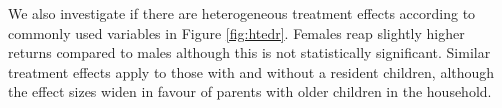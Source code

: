 \documentclass[12pt, a4paper]{article}
\begin{document}
We also investigate if there are heterogeneous treatment effects according to commonly used variables in Figure \ref{fig:htedr}. Females reap slightly higher returns compared to males although this is not statistically significant. Similar treatment effects apply to those with and without a resident children, although the effect sizes widen in favour of parents with older children in the household. 
%
\end{document}
